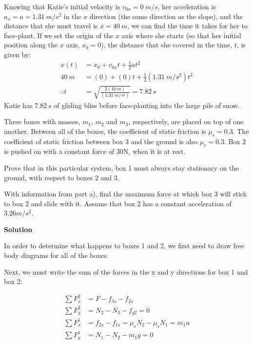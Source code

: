 \begin{problem}
Knowing that Katie's initial velocity is $v_{0x}=\SI{0}{m/s}$, her acceleration is $a_x=a=\SI{1.31}{m/s^2}$ in the $x$ direction (the same direction as the slope), and the distance that she must travel is $x=\SI{40}{m}$, we can find the time it takes for her to face-plant. If we set the origin of the $x$ axis where she starts (so that her initial position along the $x$ axis, $x_0=0$), the distance that she covered in the time, $t$, is given by:
\begin{align*}
x(t)&=x_0+v_{0x}t+\frac{1}{2}at^2\\
\SI{40}{m}&=(0)+(0)t+\frac{1}{2}(\SI{1.31}{m/s^2})t^2\\
\therefore t&=\sqrt{\frac{2(\SI{40}{m})}{(\SI{1.31}{m/s^2})}}=\SI{7.82}{s}
\end{align*}
Katie has $\SI{7.82}{s}$ of gliding bliss before face-planting into the large pile of snow.
\end{problem}

 \vspace{0.25cm}
\begin{problemParts}{Three boxes with masses, $m_1$, $m_2$ and $m_3$, respectively, are placed on top of one another. Between all of the boxes, the coefficient of static friction is $\mu_s=0.3$. The coefficient of static friction between box 3 and the ground is also $\mu_s=0.3$. Box 2 is pushed on with a constant force of 30N, when it is at rest.}
\item Prove that in this particular system, box 1 must always stay stationary on the ground, with respect to boxes 2 and 3. 
\item With information from part a), find the maximum force at which box 3 will stick to box 2 and slide with it. Assume that box 2 has a constant acceleration of $3.26 m/s^2$.
\end{problemParts}


\textbf{Solution}

In order to determine what happens to boxes 1 and 2, we first need to draw free body diagrams for all of the boxes.


Next, we must write the sum of the forces in the x and y directions for box 1 and box 2:

\begin{align*}
\sum F_x^{2}&=F-f_{3s}-f_{2s}
\\ \sum F_y^{2}&=N_{2}-N_{3}-f_{g2}=0
\\ \sum F_x^{1}&=f_{2s}-f_{1s}=\mu _sN_{2}-\mu_sN_1=m_1a
\\ \sum F_y^{1}&=N_1-N_{2}-m_1g=0
\end{align*}

